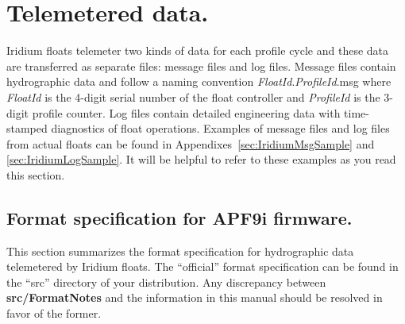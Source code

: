 %
%
%
%
%
%
%
%

\section{Telemetered data.}
\label{sec:TelemeteredData}

Iridium floats telemeter two kinds of data for each profile cycle and these
data are transferred as separate files: message files and log files.
Message files contain hydrographic data and follow a naming convention
\emph{FloatId}.\emph{ProfileId}.msg where \emph{FloatId} is the 4-digit
serial number of the float controller and \emph{ProfileId} is the 3-digit
profile counter.  Log files contain detailed engineering data with
time-stamped diagnostics of float operations.  Examples of message files and
log files from actual floats can be found in
Appendixes~\ref{sec:IridiumMsgSample} and \ref{sec:IridiumLogSample}.  It
will be helpful to refer to these examples as you read this section.

\subsection{Format specification for APF9i firmware.}

This section summarizes the format specification for hydrographic data
telemetered by Iridium floats.  The ``official'' format specification can be
found in the ``src'' directory of your distribution.  Any discrepancy
between \textbf{src/FormatNotes} and the information in this manual should
be resolved in favor of the former.

